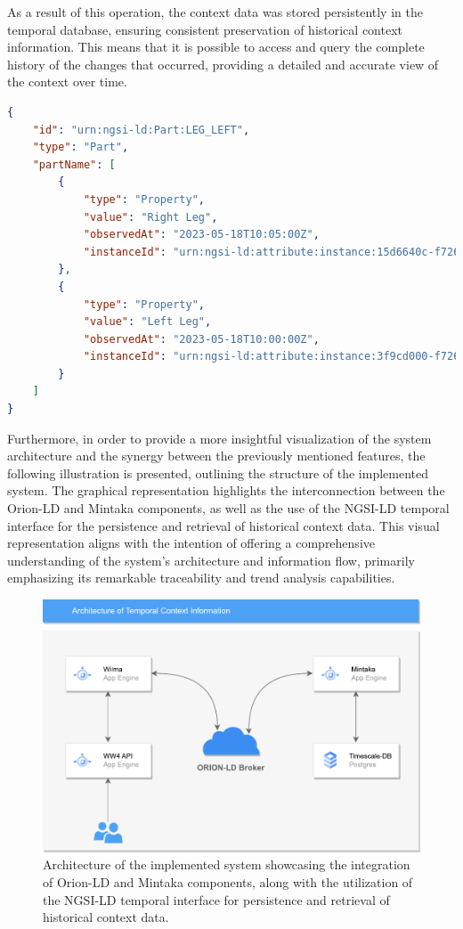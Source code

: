 As a result of this operation, the context data was stored persistently in the temporal database, ensuring consistent preservation of historical context information. This means that it is possible to access and query the complete history of the changes that occurred, providing a detailed and accurate view of the context over time.

\begin{lstlisting}[language=json, label={code:temporalOutput}, caption={The outcome achieved following the formal request made to the temporal provider for the entity's change history in JSON format.}, captionpos=b]
{
    "id": "urn:ngsi-ld:Part:LEG_LEFT",
    "type": "Part",
    "partName": [
        {
            "type": "Property",
            "value": "Right Leg",
            "observedAt": "2023-05-18T10:05:00Z",
            "instanceId": "urn:ngsi-ld:attribute:instance:15d6640c-f726-11ed-8724-0242"
        },
        {
            "type": "Property",
            "value": "Left Leg",
            "observedAt": "2023-05-18T10:00:00Z",
            "instanceId": "urn:ngsi-ld:attribute:instance:3f9cd000-f726-11ed-851b-0245"
        }
    ]
}
\end{lstlisting}

Furthermore, in order to provide a more insightful visualization of the system architecture and the synergy between the previously mentioned features, the following illustration is presented, outlining the structure of the implemented system. The graphical representation highlights the interconnection between the Orion-LD and Mintaka components, as well as the use of the NGSI-LD temporal interface for the persistence and retrieval of historical context data. This visual representation aligns with the intention of offering a comprehensive understanding of the system's architecture and information flow, primarily emphasizing its remarkable traceability and trend analysis capabilities.

\begin{figure}[ht!]
    \centering
    \includegraphics[width=.65\linewidth]{images/Development/chap4/Temporal.pdf} 
    \caption{Architecture of the implemented system showcasing the integration of Orion-LD and Mintaka components, along with the utilization of the NGSI-LD temporal interface for persistence and retrieval of historical context data.}
    \label{fig: oauth}
\end{figure}

